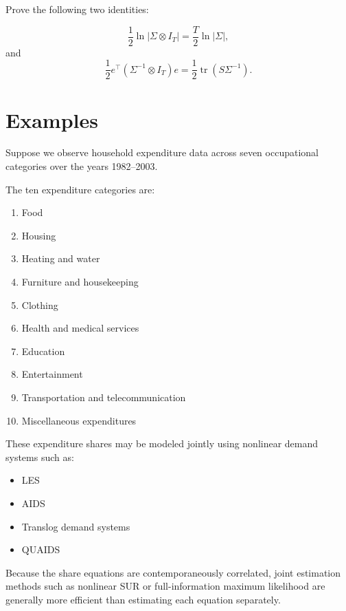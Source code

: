 Prove the following two identities:

\[
\frac12\ln|\Sigma\otimes I_T|
=
\frac{T}{2}\ln|\Sigma|,
\]
and
\[
\frac12
e^\top
(\Sigma^{-1}\otimes I_T)
e
=
\frac12
\operatorname{tr}(S\Sigma^{-1}).
\]

\section{Examples}

Suppose we observe household expenditure data across seven occupational categories over the years 1982--2003.

The ten expenditure categories are:

\begin{enumerate}
    \item Food
    \item Housing
    \item Heating and water
    \item Furniture and housekeeping
    \item Clothing
    \item Health and medical services
    \item Education
    \item Entertainment
    \item Transportation and telecommunication
    \item Miscellaneous expenditures
\end{enumerate}

These expenditure shares may be modeled jointly using nonlinear demand systems such as:

\begin{itemize}
    \item LES
    \item AIDS
    \item Translog demand systems
    \item QUAIDS
\end{itemize}

Because the share equations are contemporaneously correlated,
joint estimation methods such as nonlinear SUR or full-information maximum likelihood are generally more efficient than estimating each equation separately.


